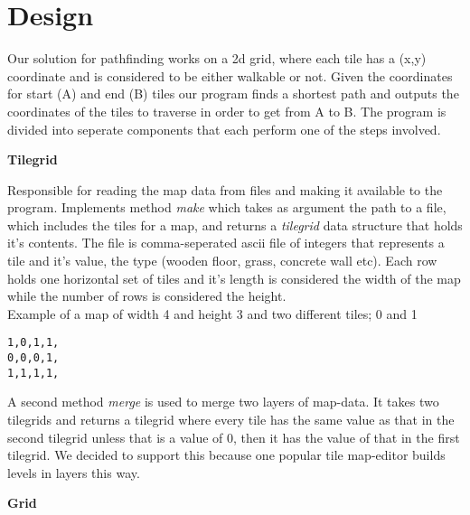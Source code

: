 \documentclass[12pt, a4paper]{article}
\begin{document}






\section{Design}
Our solution for pathfinding works on a 2d grid, where each tile has a (x,y) coordinate and is considered to be either walkable or not. Given the coordinates for start (A) and end (B) tiles our program finds a shortest path and outputs the coordinates of the tiles to traverse in order to get from A to B. The program is divided into seperate components that each perform one of the steps involved.

\textbf{Tilegrid}

Responsible for reading the map data from files and making it available to the program. Implements method \textit{make} which takes as argument the path to a file, which includes the tiles for a map, and returns a \textit{tilegrid} data structure that holds it's contents. The file is comma-seperated ascii file of integers that represents a tile and it's value, the type (wooden floor, grass, concrete wall etc). Each row holds one horizontal set of tiles and it's length is considered the width of the map while the number of rows is considered the height.
\\Example of a map of width 4 and height 3 and two different tiles; 0 and 1

\texttt{1,0,1,1,\\
0,0,0,1,\\
1,1,1,1,\\
}

A second method \textit{merge} is used to merge two layers of map-data. It takes two tilegrids and returns a tilegrid where every tile has the same value as that in the second tilegrid unless that is a value of 0, then it has the value of that in the first tilegrid. We decided to support this because one popular tile map-editor\cite{mapeditor} builds levels in layers this way.

\textbf{Grid}
\end{document}
